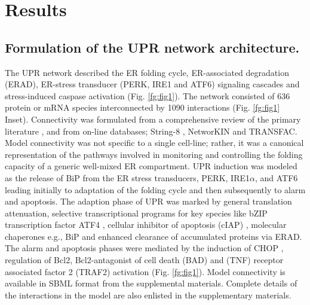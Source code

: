 \documentclass[fleqn,10pt]{wlscirep}
\begin{document}
\section*{Results}

\subsection*{Formulation of the UPR network architecture.}
The UPR network described the ER folding cycle, ER-associated degradation (ERAD), ER-stress transducer (PERK, IRE1 and ATF6) signaling cascades and stress-induced caspase activation (Fig. \ref{fg:fig1}). The network consisted of 636 protein or mRNA species interconnected by 1090 interactions (Fig. \ref{fg:fig1} Inset). Connectivity was formulated from a comprehensive review of the primary literature  \cite{naidoo2009er, ron2002translational, kaufman2002unfolded,ellgaard2003qce,Fonseca:2009fk,Schroder:2005vn,gotoh:hdc,mccullough2001gsc, belmont2008cga,Hetz:2009qc,Urano:2000uq,szegezdi2006mediators}, and from on-line databases; String-8 \cite{Jensen:2009fk}, NetworKIN \cite{Linding:2007fk} and TRANSFAC. Model connectivity was not specific to a single cell-line; rather, it was a canonical representation of the pathways involved in monitoring and controlling the folding capacity of a generic well-mixed ER compartment. UPR induction was modeled as the release of BiP from the ER stress transducers, PERK, IRE1$\alpha$, and ATF6 leading initially to adaptation of the folding cycle and then subsequently to alarm and apoptosis. The adaption phase of UPR was marked by general translation attenuation, selective transcriptional programs for key species like bZIP transcription factor ATF4 \cite{lu2004tra}, cellular inhibitor of apoptosis (cIAP) \cite{hamanaka2008pdr}, molecular chaperones e.g., BiP \cite{harding2003isr} and enhanced clearance of accumulated proteins via ERAD. The alarm and apoptosis phases were mediated by the induction of CHOP \cite{ron1992cnd}, regulation of Bcl2, Bcl2-antagonist of cell death (BAD) \cite {wang1999cia} and (TNF) receptor associated factor 2 (TRAF2) \cite{lei2003jpb,putcha2003jmb, yamamoto1999bpa, szegezdi2006mediators} activation (Fig. \ref{fg:fig1}). Model connectivity is available in SBML format from the supplemental materials. Complete details of the interactions in the model are also enlisted in the supplementary materials.

\end{document}
